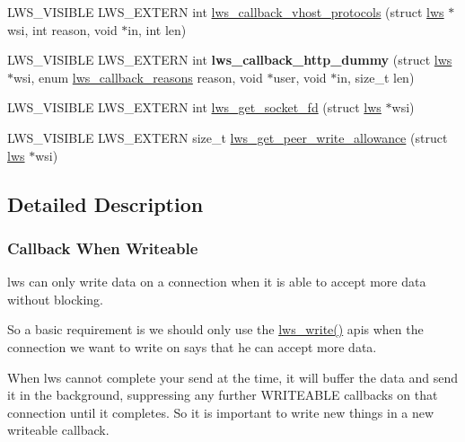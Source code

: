\begin{DoxyCompactItemize}
\item 
L\+W\+S\+\_\+\+V\+I\+S\+I\+B\+LE L\+W\+S\+\_\+\+E\+X\+T\+E\+RN int \hyperlink{group__callback-when-writeable_ga60939cf0c073d933fde3d17f3591caf5}{lws\+\_\+callback\+\_\+vhost\+\_\+protocols} (struct \hyperlink{structlws}{lws} $\ast$wsi, int reason, void $\ast$in, int len)
\item 
\mbox{\label{group__callback-when-writeable_gaad3d524a84d2be08ac85153bc158504b}} 
L\+W\+S\+\_\+\+V\+I\+S\+I\+B\+LE L\+W\+S\+\_\+\+E\+X\+T\+E\+RN int {\bfseries lws\+\_\+callback\+\_\+http\+\_\+dummy} (struct \hyperlink{structlws}{lws} $\ast$wsi, enum \hyperlink{group__usercb_gad62860e19975ba4c4af401c3cdb6abf7}{lws\+\_\+callback\+\_\+reasons} reason, void $\ast$user, void $\ast$in, size\+\_\+t len)
\item 
L\+W\+S\+\_\+\+V\+I\+S\+I\+B\+LE L\+W\+S\+\_\+\+E\+X\+T\+E\+RN int \hyperlink{group__callback-when-writeable_gaa709e02a10558753c851e58f1e2c16ba}{lws\+\_\+get\+\_\+socket\+\_\+fd} (struct \hyperlink{structlws}{lws} $\ast$wsi)
\item 
L\+W\+S\+\_\+\+V\+I\+S\+I\+B\+LE L\+W\+S\+\_\+\+E\+X\+T\+E\+RN size\+\_\+t \hyperlink{group__callback-when-writeable_gac4643fe16b0940ae5b68b4ee6195cbde}{lws\+\_\+get\+\_\+peer\+\_\+write\+\_\+allowance} (struct \hyperlink{structlws}{lws} $\ast$wsi)
\end{DoxyCompactItemize}


\subsection{Detailed Description}
\subsubsection*{Callback When Writeable}

lws can only write data on a connection when it is able to accept more data without blocking.

So a basic requirement is we should only use the \hyperlink{group__sending-data_gafd5fdd285a0e25ba7e3e1051deec1001}{lws\+\_\+write()} apis when the connection we want to write on says that he can accept more data.

When lws cannot complete your send at the time, it will buffer the data and send it in the background, suppressing any further W\+R\+I\+T\+E\+A\+B\+LE callbacks on that connection until it completes. So it is important to write new things in a new writeable callback.

